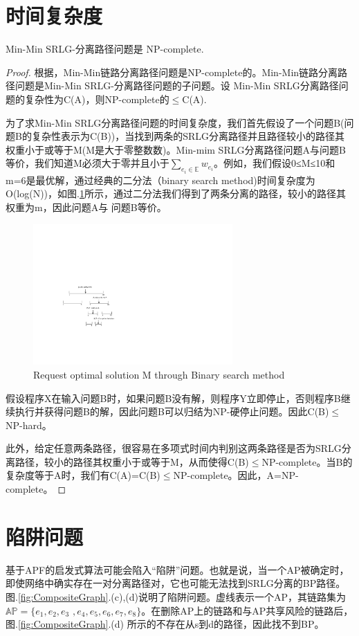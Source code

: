\section{时间复杂度}
\begin{theorem}
\label{le:lemma1}
    Min-Min SRLG-分离路径问题是 NP-complete.
\end{theorem}
\begin{proof}
根据\cite{bhatia2006finding}，Min-Min链路分离路径问题是NP-complete的。Min-Min链路分离路径问题是Min-Min SRLG-分离路径问题的子问题。设
Min-Min SRLG分离路径问题的复杂性为C(A)，则NP-complete的$\leq$C(A).

为了求Min-Min SRLG分离路径问题的时间复杂度，我们首先假设了一个问题B(问题B的复杂性表示为C(B))，当找到两条的SRLG分离路径并且路径较小的路径其权重小于或等于M(M是大于零整数数)。Min-mim SRLG分离路径问题A与问题B等价，我们知道M必须大于零并且小于$\sum\limits_{e_i\in \mathbb{E}}w_{e_i}$。例如，我们假设0≤M≤10和m=6是最优解，通过经典的二分法（binary search method)时间复杂度为O(log(N))，如图.\ref{fig:binarySearch}所示，通过二分法我们得到了两条分离的路径，较小的路径其权重为m，因此问题A与 问题B等价。
\begin{figure}[htp]
  \centering
  \includegraphics[width=3.0in]{figures/binarySearch}
  \caption{Request optimal solution M through Binary search method }
  \label{fig:binarySearch}
\end{figure}
假设程序X在输入问题B时，如果问题B没有解，则程序Y立即停止，否则程序B继续执行并获得问题B的解，因此问题B可以归结为NP-硬停止问题。因此C(B)$\leq$NP-hard。

此外，给定任意两条路径，很容易在多项式时间内判别这两条路径是否为SRLG分离路径，较小的路径其权重小于或等于M，从而使得C(B)$\leq$NP-complete。当B的复杂度等于A时，我们有C(A)=C(B)$\leq$NP-complete。因此，A=NP-complete。
\end{proof}
\section{陷阱问题}
基于APF的启发式算法可能会陷入“陷阱”问题。也就是说，当一个AP被确定时，即使网络中确实存在一对分离路径对，它也可能无法找到SRLG分离的BP路径。图.\ref{fig:CompositeGraph}.(c),(d)说明了陷阱问题。虚线表示一个AP，其链路集为$\mathbb{AP}=\{e_1,e_2,e_3$ $,e_4,e_5,e_6,e_7,e_8\}$。在删除AP上的链路和与AP共享风险的链路后，图.\ref{fig:CompositeGraph}.(d) 所示的不存在从s到d的路径，因此找不到BP。

